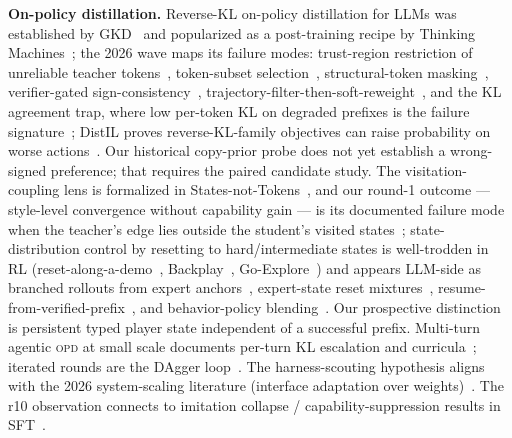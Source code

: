 \documentclass[11pt]{article}
\newcommand{\opd}{\textsc{opd}}
\begin{document}
\textbf{On-policy distillation.} Reverse-KL on-policy distillation for LLMs was established by
GKD~\cite{gkd} and popularized as a post-training recipe by Thinking Machines~\cite{tml}; the 2026 wave maps its failure modes: trust-region restriction of unreliable
teacher tokens~\cite{tropd}, token-subset selection~\cite{tip,teachability}, structural-token
masking~\cite{simplefixes,rocktokens}, verifier-gated sign-consistency~\cite{sgopd},
trajectory-filter-then-soft-reweight~\cite{fire}, and the KL agreement trap, where low per-token
KL on degraded prefixes is the failure signature~\cite{kat}; DistIL proves reverse-KL-family
objectives can raise probability on worse actions~\cite{distil}. Our historical copy-prior probe
does not yet establish a wrong-signed preference; that requires the paired candidate study. The
visitation-coupling lens is formalized in States-not-Tokens~\cite{snt},
and our round-1 outcome --- style-level convergence without capability gain --- is its documented
failure mode when the teacher's edge lies outside the student's visited states~\cite{rethinking};
state-distribution control by resetting to hard/intermediate states is well-trodden in RL
(reset-along-a-demo~\cite{salchen}, Backplay~\cite{backplay}, Go-Explore~\cite{goexplore}) and
appears LLM-side as branched rollouts from expert anchors~\cite{bread}, expert-state reset
mixtures~\cite{reset5050}, resume-from-verified-prefix~\cite{score}, and behavior-policy
blending~\cite{trb}. Our prospective distinction is persistent typed player state independent of a
successful prefix. Multi-turn agentic \opd{} at small scale documents per-turn KL
escalation and curricula~\cite{tcod}; iterated rounds are the DAgger loop~\cite{dagger,survey}.
The harness-scouting hypothesis aligns with the 2026 system-scaling literature (interface
adaptation over weights)~\cite{lifeharness,systemscaling}. The r10 observation connects to imitation
collapse / capability-suppression results in SFT~\cite{gem}.
\end{document}
